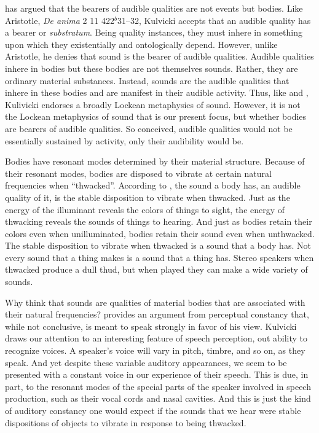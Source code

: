 \citet{Kulvicki:2008aa} has argued that the bearers of audible qualities are not events but bodies. Like Aristotle, \emph{De anima} 2 11 422\( ^{b} \)31–32, Kulvicki accepts that an audible quality has a bearer or \emph{substratum}. Being quality instances, they must inhere in something upon which they existentially and ontologically depend. However, unlike Aristotle, he denies that sound is the bearer of audible qualities. Audible qualities inhere in bodies but these bodies are not themselves sounds. Rather, they are ordinary material substances. Instead, sounds are the audible qualities that inhere in these bodies and are manifest in their audible activity. Thus, like \citet{Pasnau:1999ss} and \citet{Leddington:2014aa}, Kulivicki endorses a broadly Lockean metaphysics of sound. However, it is not the Lockean metaphysics of sound that is our present focus, but whether bodies are bearers of audible qualities. So conceived, audible qualities would not be essentially sustained by activity, only their audibility would be.

Bodies have resonant modes determined by their material structure. Because of their resonant modes, bodies are disposed to vibrate at certain natural frequencies when ``thwacked''. According to \citet{Kulvicki:2008aa}, the sound a body has, an audible quality of it, is the stable disposition to vibrate when thwacked. Just as the energy of the illuminant reveals the colors of things to sight, the energy of thwacking reveals the sounds of things to hearing. And just as bodies retain their colors even when unilluminated, bodies retain their sound even when unthwacked. The stable disposition to vibrate when thwacked is a sound that a body has. Not every sound that a thing makes is a sound that a thing has. Stereo speakers when thwacked produce a dull thud, but when played they can make a wide variety of sounds.

Why think that sounds are qualities of material bodies that are associated with their natural frequencies? \citet[]{Kulvicki:2008aa} provides an argument from perceptual constancy that, while not conclusive, is meant to speak strongly in favor of his view. Kulvicki draws our attention to an interesting feature of speech perception, out ability to recognize voices. A speaker's voice will vary in pitch, timbre, and so on, as they speak. And yet despite these variable auditory appearances, we seem to be presented with a constant voice in our experience of their speech. This is due, in part, to the resonant modes of the special parts of the speaker involved in speech production, such as their vocal cords and nasal cavities. And this is just the kind of auditory constancy one would expect if the sounds that we hear were stable dispositions of objects to vibrate in response to being thwacked.

